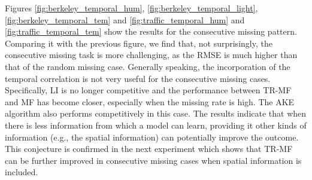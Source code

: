 Figures \ref{fig:berkeley_temporal_hum}, 
\ref{fig:berkeley_temporal_light}, 
\ref{fig:berkeley_temporal_tem} and \ref{fig:traffic_temporal_hum} and \ref{fig:traffic_temporal_tem} show the results for the consecutive missing pattern.
Comparing it with the previous figure, we find that, not surprisingly, the consecutive missing task is more challenging,
as the RMSE is much higher than that of the random missing case.
Generally speaking, the incorporation of the temporal correlation is not very useful for the consecutive missing cases.
Specifically, LI is no longer competitive and the performance between TR-MF and MF has become closer, especially when the missing rate is high.
The AKE algorithm also performs competitively in this case.
The results indicate that when there is less information from which a model can learn, providing it other kinds of information 
(e.g., the spatial information) can potentially improve the outcome.
This conjecture is confirmed in the next experiment which shows that TR-MF can be further improved in consecutive missing cases when spatial information is included.

